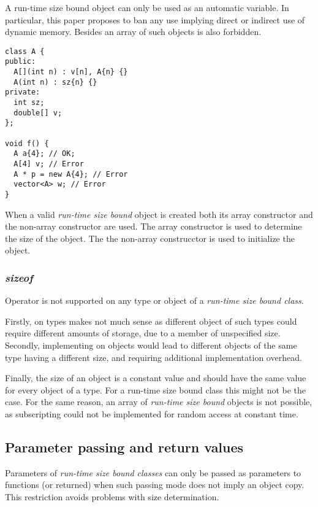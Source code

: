 A run-time size bound object can only be used as an automatic variable.
In particular, this paper proposes to ban any use implying direct or indirect
use of dynamic memory. Besides an array of such objects is also forbidden.

\begin{lstlisting}
class A {
public:
  A[](int n) : v[n], A{n} {}
  A(int n) : sz{n} {}
private:
  int sz;
  double[] v;
};

void f() {
  A a{4}; // OK;
  A[4] v; // Error
  A * p = new A{4}; // Error
  vector<A> w; // Error
}
\end{lstlisting}

When a valid \emph{run-time size bound} object is created both its array constructor
and the non-array constructor are used. The array constructor is used to determine the
size of the object. The the non-array construcctor is used to initialize the object.

\subsubsection{\emph{sizeof}}

Operator  is not supported on any type or object of a \emph{run-time size bound class}.

Firstly, on types  makes not much sense as different object of such types could require
different amounts of storage, due to a member of unspecified size. Secondly, implementing 
on objects would lead to different objects of the same type having a different size, and requiring
additional implementation overhead.

Finally, the size of an object is a constant value and should have the same value for every object of
a type. For a run-time size bound class this might not be the case. For the same reason, an array of
\emph{run-time size bound} objects is not possible, as subscripting could not be implemented for
random access at constant time.

\subsection{Parameter passing and return values}

Parameters of \emph{run-time size bound classes} can only be passed as parameters to functions (or returned)
when such passing mode does not imply an object copy. This restriction avoids problems with size determination.

